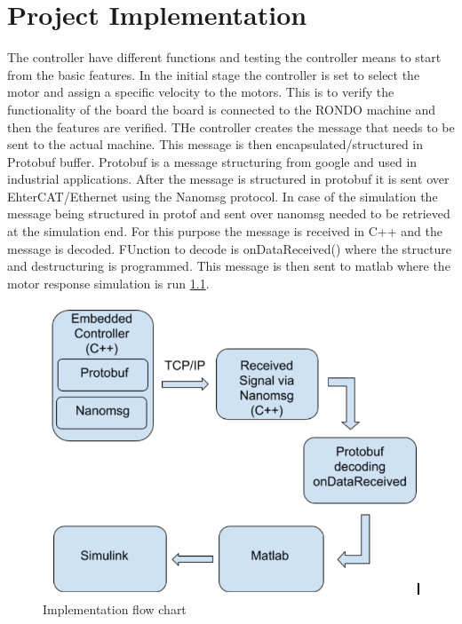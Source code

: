 \documentclass{listhesis}
\begin{document}
\chapter{Project Implementation}
The controller have different functions and testing the controller means to start from the basic features. In the initial stage the controller is set to select the motor and assign a specific velocity to the motors. This is to verify the functionality of the board the board is connected to the RONDO machine and then the features are verified. THe controller creates the message that needs to be sent to the actual machine. This message is then encapsulated/structured in Protobuf buffer. Protobuf is a message structuring from google and used in industrial applications. After the message is structured in protobuf it is sent over EhterCAT/Ethernet using the Nanomsg protocol. In case of the simulation the message being structured in protof and sent over nanomsg needed to be retrieved at the simulation end. For this purpose the message is received in C++ and the message is decoded. FUnction to decode is onDataReceived() where the structure and destructuring is programmed. This message is then sent to matlab where the motor response simulation is run \ref{fig:implementation}.



\begin{figure}
  \includegraphics[width=0.7\linewidth]{implementation.png}
  \centering
  \caption{Implementation flow chart}
  \label{fig:implementation}
\end{figure}
\end{document}
